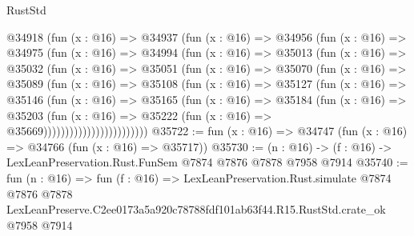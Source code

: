 \begin{lexlean}{RustStd}
\begin{coremodule}
                @34918
                  (fun (x : @16) =>
                  @34937
                    (fun (x : @16) =>
                    @34956
                      (fun (x : @16) =>
                      @34975
                        (fun (x : @16) =>
                        @34994
                          (fun (x : @16) =>
                          @35013
                            (fun (x : @16) =>
                            @35032
                              (fun (x : @16) =>
                              @35051
                                (fun (x : @16) =>
                                @35070
                                  (fun (x : @16) =>
                                  @35089
                                    (fun (x : @16) =>
                                    @35108
                                      (fun (x : @16) =>
                                      @35127
                                        (fun (x : @16) =>
                                        @35146
                                          (fun (x : @16) =>
                                          @35165
                                            (fun (x : @16) =>
                                            @35184
                                              (fun (x : @16) =>
                                              @35203
                                                (fun (x : @16) =>
                                                @35222
                                                  (fun (x : @16) => @35669))))))))))))))))))))))))
@35722 := fun (x : @16) => @34747 (fun (x : @16) => @34766 (fun (x : @16) => @35717))
@35730 := (n : @16) -> (f : @16) -> LexLeanPreservation.Rust.FunSem @7874 @7876 @7878 @7958 @7914
@35740 := fun (n : @16) =>
  fun (f : @16) =>
  LexLeanPreservation.Rust.simulate
    @7874
    @7876
    @7878
    LexLeanPreserve.C2ee0173a5a920c78788fdf101ab63f44.R15.RustStd.crate_ok
    @7958
    @7914
\end{coremodule}
\end{lexlean}
